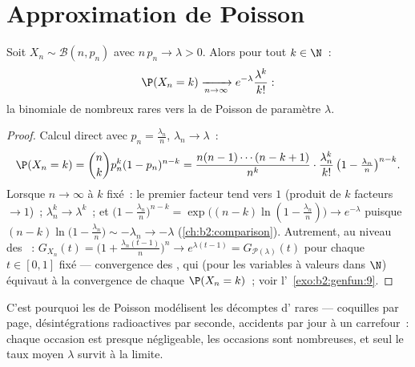 \section{Approximation de Poisson}

\begin{theorem}\label{thm:b2:genfun:rareevents}
Soit $X_n \sim \mathcal{B}(n, p_n)$ avec $n\,p_n \to \lambda > 0$.
Alors pour tout $k \in \N$~:
\[
\P(X_n = k)
\xrightarrow[n\to\infty]{}
e^{-\lambda}\frac{\lambda^k}{k!} :
\]
la  binomiale de nombreux  rares  
vers la  de Poisson de paramètre $\lambda$.
\end{theorem}

\begin{proof}
Calcul direct avec $p_n = \frac{\lambda_n}{n}$, $\lambda_n
\to \lambda$~:
\[
\P(X_n = k)
= \binom nk p_n^k(1 - p_n)^{n-k}
= \frac{n(n-1)\cdots(n-k+1)}{n^k}\cdot
\frac{\lambda_n^k}{k!}\,
\bigl(1 - \tfrac{\lambda_n}{n}\bigr)^{n-k} .
\]
Lorsque $n \to \infty$ à $k$ fixé~: le premier facteur tend vers $1$
(produit de $k$ facteurs $\to 1$)~; $\lambda_n^k \to \lambda^k$~;
et $\bigl(1 - \frac{\lambda_n}{n}\bigr)^{n-k} =
\exp\bigl((n-k)\ln(1 - \frac{\lambda_n}{n})\bigr) \to
e^{-\lambda}$ puisque $(n - k)\ln\bigl(1 - \frac{\lambda_n}{n}\bigr)
\sim -\lambda_n \to -\lambda$
(\cref{ch:b2:comparison}). Autrement, au niveau des ~: $G_{X_n}(t) = \bigl(1 +
\frac{\lambda_n(t-1)}{n}\bigr)^n \to e^{\lambda(t - 1)} =
G_{\mathcal{P}(\lambda)}(t)$ pour chaque $t \in [0, 1]$ fixé ---
convergence des , qui (pour les variables à
valeurs dans $\N$) équivaut à la convergence de chaque $\P(X_n = k)$~;
voir l'~\cref{exo:b2:genfun:9}.
\end{proof}

\begin{remark}
C'est pourquoi les  de Poisson modélisent les décomptes
d' rares --- coquilles par page, désintégrations
radioactives par seconde, accidents par jour à un carrefour~: chaque
occasion est presque négligeable, les occasions sont nombreuses, et
seul le taux moyen $\lambda$ survit à la limite.
\end{remark}

